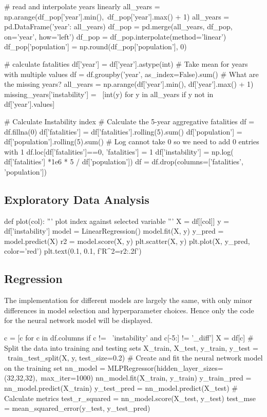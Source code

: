 \documentclass[twocolumn]{article}
\begin{document}
\begin{appendices}
\begin{python}
# read and interpolate years linearly
all_years = np.arange(df_pop['year'].min(),\
df_pop['year'].max() + 1)
all_years = pd.DataFrame({'year': all_years})
df_pop = pd.merge(all_years, df_pop, on='year', how='left')
df_pop = df_pop.interpolate(method='linear')
df_pop['population'] = np.round(df_pop['population'], 0)

# calculate fatalities
df['year'] = df['year'].astype(int)
# Take mean for years with multiple values
df = df.groupby('year', as_index=False).sum()
# What are the missing years?
all_years = np.arange(df['year'].min(), df['year'].max() + 1)
missing_years['instability'] = \
[int(y) for y in all_years if y not in df['year'].values]

# Calculate Instability index
# Calculate the 5-year aggregative fatalities
df = df.fillna(0)
df['fatalities'] = df['fatalities'].rolling(5).sum()
df['population'] = df['population'].rolling(5).sum()
# Log cannot take 0 so we need to add 0 entries with 1
df.loc[df['fatalities']==0, 'fatalities'] = 1
df['instability'] = np.log(
    df['fatalities'] *1e6 * 5 / df['population'])
df = df.drop(columns=['fatalities', 'population'])
\end{python}
\newpage
\subsection{Exploratory Data Analysis}
\begin{python}
def plot(col):
    '''
    plot index against selected variable
    '''
    X = df[[col]]
    y = df['instability']
    model = LinearRegression()
    model.fit(X, y)
    y_pred = model.predict(X)
    r2 = model.score(X, y)
    plt.scatter(X, y)
    plt.plot(X, y_pred, color='red')
    plt.text(0.1, 0.1, f'R^2={r2:.2f}')
\end{python}

\subsection{Regression}
The implementation for different models are largely the same, with only minor differences in model selection and hyperparameter choices. Hence only the code for the neural network model will be displayed.
\begin{python}
c = [c for c in df.columns if c != \
'instability' and c[-5:] != '_diff'] 
X = df[c]
# Split the data into training and testing sets
X_train, X_test, y_train, y_test = \
train_test_split(X, y, test_size=0.2)
# Create and fit the neural network model on the training set
nn_model = MLPRegressor(hidden_layer_sizes=(32,32,32),\
max_iter=1000)
nn_model.fit(X_train, y_train)
y_train_pred = nn_model.predict(X_train)
y_test_pred = nn_model.predict(X_test)
# Calculate metrics
test_r_squared = nn_model.score(X_test, y_test)
test_mse = mean_squared_error(y_test, y_test_pred)
\end{python}

\end{appendices}
\end{document}

